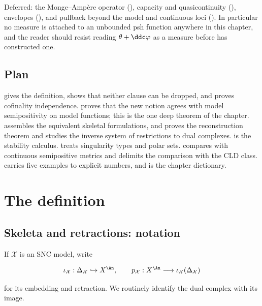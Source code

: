 Deferred: the Monge--Amp\`ere operator (), capacity and
quasicontinuity (), envelopes
(), and pullback beyond the model and continuous
loci ().  In particular no measure is attached
to an unbounded psh function anywhere in this chapter, and the reader should
resist reading \(\theta+\ddc\varphi\) as a measure before
 has constructed one.

\subsection{Plan}
\label{sec:ch21-plan}

 gives the definition, shows that neither clause
can be dropped, and proves cofinality independence.
 proves that the new notion agrees with model
semipositivity on model functions; this is the one deep theorem of the
chapter.   assembles the equivalent skeletal
formulations, and  proves the reconstruction
theorem and studies the inverse system of restrictions to dual complexes.
 is the stability calculus.
 treats singularity types and polar sets.
 compares with continuous semipositive metrics and
delimits the comparison with the CLD class.   carries
five examples to explicit numbers, and
 is the chapter dictionary.

\section{The definition}
\label{sec:ch21-definition}

\subsection{Skeleta and retractions: notation}
\label{sec:ch21-notation}

If \(\mathcal X\) is an SNC model, write

\begin{equation}
\label{eq:ch21-skeletal-maps}
 \iota_{\mathcal X}:\Delta_{\mathcal X}\hookrightarrow X^{\An},
 \qquad
 p_{\mathcal X}:X^{\An}\longrightarrow
       \iota_{\mathcal X}(\Delta_{\mathcal X})
\end{equation}

for its embedding and retraction.  We routinely identify the dual complex
with its image.

